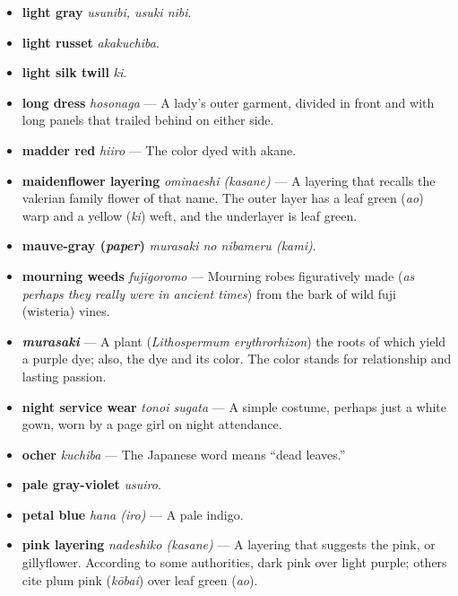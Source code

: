 \documentclass{article}
\begin{document}
\begin{multicols}{3}
\begin{footnotesize}
\begin{itemize}[
			label=,
			leftmargin=0em,
			rightmargin=-1.5em,
			itemindent=-2em,
			nosep,
		]
		\item \textbf{light gray} \textit{usunibi, usuki nibi}.

		\item \textbf{light russet} \textit{akakuchiba}.

		\item \textbf{light silk twill} \textit{ki}.

		\item \textbf{long dress} \textit{hosonaga} --- A lady's outer garment, divided in front and with long panels that trailed behind on either side.

		\item \textbf{madder red} \textit{hiiro} --- The color dyed with akane.

		\item \textbf{maidenflower layering} \textit{ominaeshi (\textit{kasane})} --- A layering that recalls the valerian family flower of that name. The outer layer has a leaf green (\textit{ao}) warp and a yellow (\textit{ki}) weft, and the underlayer is leaf green.

		\item \textbf{mauve-gray (\textit{paper})} \textit{murasaki no nibameru (\textit{kami})}.

		\item \textbf{mourning weeds} \textit{fujigoromo} --- Mourning robes figuratively made (\textit{as perhaps they really were in ancient times}) from the bark of wild fuji (wisteria) vines.

		\item \textbf{\textit{murasaki}} --- A plant (\textit{Lithospermum erythrorhizon}) the roots of which yield a purple dye; also, the dye and its color. The color stands for relationship and lasting passion.

		\item \textbf{night service wear} \textit{tonoi sugata} --- A simple costume, perhaps just a white gown, worn by a page girl on night attendance.

		\item \textbf{ocher} \textit{kuchiba} --- The Japanese word means “dead leaves.”

		\item \textbf{pale gray-violet} \textit{usuiro}.

		\item \textbf{petal blue} \textit{hana (\textit{iro})} --- A pale indigo.

		\item \textbf{pink layering} \textit{nadeshiko (\textit{kasane})} --- A layering that suggests the pink, or gillyflower. According to some authorities, dark pink over light purple; others cite plum pink (\textit{kōbai}) over leaf green (\textit{ao}).


\end{itemize}
\end{footnotesize}
\end{multicols}
\end{document}
